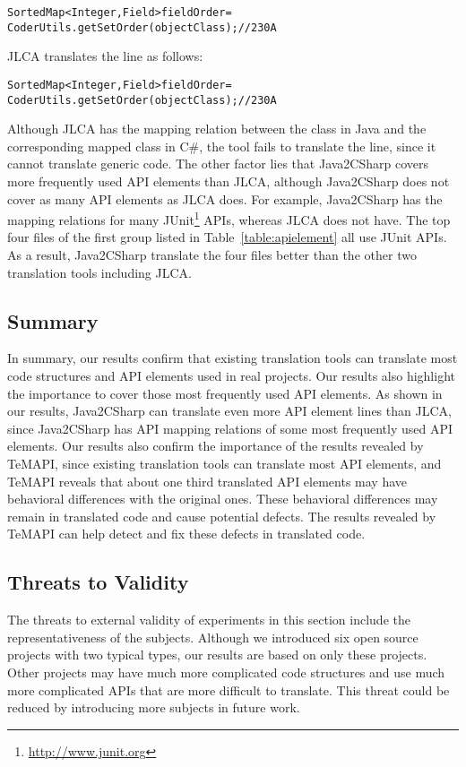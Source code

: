 \begin{CodeOut}%
\begin{alltt}
SortedMap<Integer,Field> fieldOrder =
        CoderUtils.getSetOrder(objectClass);//230A
\end{alltt}
\end{CodeOut}

JLCA translates the line as follows:

\begin{CodeOut}%
\begin{alltt}
SortedMap < Integer, Field > fieldOrder =
        CoderUtils.getSetOrder(objectClass); //230A
\end{alltt}
\end{CodeOut}

Although JLCA has the mapping relation between the  class in Java and the corresponding mapped class in C\#, the tool fails to translate the line, since it cannot translate generic code. The other factor lies that Java2CSharp covers more frequently used API elements than JLCA, although Java2CSharp does not cover as many API elements as JLCA does. For example, Java2CSharp has the mapping relations for many JUnit\footnote{\url{http://www.junit.org}} APIs, whereas JLCA does not have. The top four files of the first group listed in Table~\ref{table:apielement} all use JUnit APIs. As a result, Java2CSharp translate the four files better than the other two translation tools including JLCA.

\subsection{Summary}
\label{sec:real:summary}
In summary, our results confirm that existing translation tools can translate most code structures and API elements used in real projects. Our results also highlight the importance to cover those most frequently used API elements. As shown in our results, Java2CSharp can translate even more API element lines than JLCA, since Java2CSharp has API mapping relations of some most frequently used API elements. Our results also confirm the importance of the results revealed by TeMAPI, since existing translation tools can translate most API elements, and TeMAPI reveals that about one third translated API elements may have behavioral differences with the original ones. These behavioral differences may remain in translated code and cause potential defects. The results revealed by TeMAPI can help detect and fix these defects in translated code.

\subsection{Threats to Validity}
\label{sec:real:threat}
The threats to external validity of experiments in this section include the representativeness of the subjects. Although we introduced six open source projects with two typical types, our results are based on only these projects. Other projects may have much more complicated code structures and use much more complicated APIs that are more difficult to translate. This threat could be reduced by introducing more subjects in future work. 